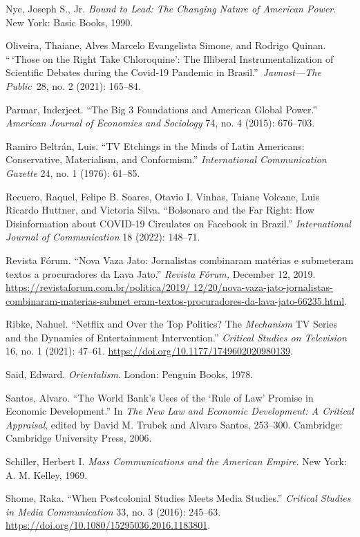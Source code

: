 \documentclass{tufte-handout}
\begin{document}
\begin{hangparas}{.25in}{1}
Nye, Joseph S., Jr. \emph{Bound to Lead: The Changing Nature of American
Power}. New York: Basic Books, 1990.

Oliveira, Thaiane, Alves Marcelo Evangelista Simone, and Rodrigo Quinan.
``\,`Those on the Right Take Chloroquine': The Illiberal
Instrumentalization of Scientific Debates during the Covid‐19 Pandemic
in Brasil.''~\emph{Javnost---The Public}~28, no. 2 (2021): 165--84.

Parmar, Inderjeet. ``The Big 3 Foundations and American Global Power.''
\emph{American Journal of Economics and Sociology} 74, no. 4 (2015):
676--703.

Ramiro Beltrán, Luis. ``TV Etchings in the Minds of Latin Americans:
Conservative, Materialism, and Conformism.'' \emph{International
Communication Gazette} 24, no. 1 (1976): 61--85.

Recuero, Raquel, Felipe B. Soares, Otavio I. Vinhas, Taiane Volcane,
Luis Ricardo Huttner, and Victoria Silva. ``Bolsonaro and the Far Right:
How Disinformation about COVID-19 Circulates on Facebook in Brazil.''
\emph{International Journal of Communication} 18 (2022): 148--71.

Revista Fórum. ``Nova Vaza Jato: Jornalistas combinaram matérias e
submeteram textos a procuradores da Lava Jato.'' \emph{Revista Fórum,}
December 12, 2019.
\href{https://revistaforum.com.br/politica/2019/12/20/nova-vaza-jato-jornalistas-combinaram-materias-submeteram-textos-procuradores-da-lava-jato-66235.html}{https://revistaforum.com.br/politica/2019/ 12/20/nova-vaza-jato-jornalistas-combinaram-materias-submet eram-textos-procuradores-da-lava-jato-66235.html}.

Ribke, Nahuel. ``Netflix and Over the Top Politics? The \emph{Mechanism}
TV Series and the Dynamics of Entertainment Intervention.''
\emph{Critical Studies on Television} 16, no. 1 (2021): 47--61.
\url{https://doi.org/10.1177/1749602020980139}.

Said, Edward. \emph{Orientalism}. London: Penguin Books, 1978.

Santos, Alvaro. ``The World Bank's Uses of the `Rule of Law' Promise in
Economic Development.'' In \emph{The New Law and Economic Development: A
Critical Appraisal}, edited by David M. Trubek and Alvaro Santos,
253--300. Cambridge: Cambridge University Press, 2006.

Schiller, Herbert I. \emph{Mass Communications and the American Empire}.
New York: A. M. Kelley, 1969.

Shome, Raka. ``When Postcolonial Studies Meets Media Studies.''
\emph{Critical Studies in Media Communication} 33, no. 3 (2016):
245--63. \url{https://doi.org/10.1080/15295036.2016.1183801}.


\end{hangparas}
\end{document}
